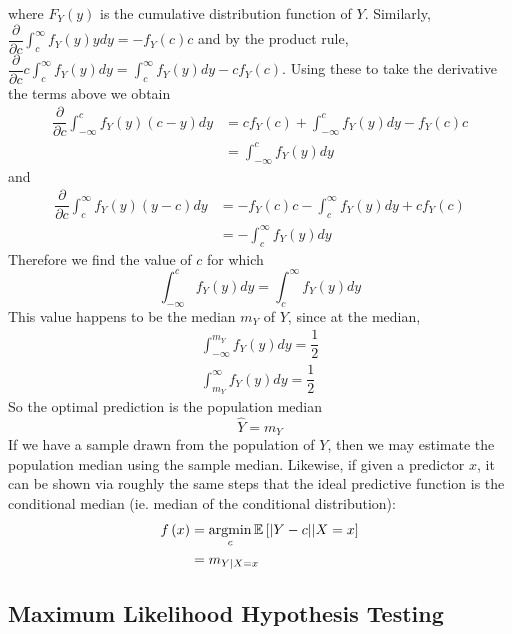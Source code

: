 \documentclass[11pt]{report} %
\begin{document}
where $F_{Y}\left(y\right)$ is the cumulative distribution function of $Y$. Similarly, $\dfrac{\partial }{\partial c}\int_{c}^{\infty}f_{Y}\left(y\right)ydy = -f_{Y}\left(c\right)c$ and by the product rule, $\dfrac{\partial }{\partial c}c\int_{c}^{\infty}f_{Y}\left(y\right)dy = \int_{c}^{\infty}f_{Y}\left(y\right)dy - cf_{Y}\left(c\right)$. Using these to take the derivative the terms above we obtain
\begin{align}
\dfrac{\partial }{\partial c}\int_{-\infty}^{c}f_{Y}\left(y\right)\left(c - y\right)dy &= cf_{Y}\left(c\right) + \int_{-\infty}^{c}f_{Y}\left(y\right)dy - f_{Y}\left(c\right)c \\
&= \int_{-\infty}^{c}f_{Y}\left(y\right)dy
\end{align}
and
\begin{align}
\dfrac{\partial }{\partial c}\int_{c}^{\infty}f_{Y}\left(y\right)\left(y - c\right)dy &= -f_{Y}\left(c\right)c - \int_{c}^{\infty}f_{Y}\left(y\right)dy + cf_{Y}\left(c\right) \\
&= - \int_{c}^{\infty}f_{Y}\left(y\right)dy
\end{align}
Therefore we find the value of $c$ for which
\begin{equation}
\int_{-\infty}^{c}f_{Y}\left(y\right)dy = \int_{c}^{\infty}f_{Y}\left(y\right)dy
\end{equation}
This value happens to be the median $m_{Y}$ of $Y$, since at the median,
\begin{gather}
\int_{-\infty}^{m_{Y}}f_{Y}\left(y\right)dy = \dfrac{1}{2} \\
\int_{m_{Y}}^{\infty}f_{Y}\left(y\right)dy = \dfrac{1}{2}
\end{gather}
So the optimal prediction is the population median
\begin{equation}
\hat{Y} = m_{Y}
\end{equation}
If we have a sample drawn from the population of $Y$, then we may estimate the population median using the sample median. Likewise, if given a predictor $x$, it can be shown via roughly the same steps that the ideal predictive function is the conditional median (ie. median of the conditional distribution):
\begin{align}
f\left(x\right) &= \operatorname*{argmin}_{c}\mathbb{E}\left[\left|Y - c\right|\middle|X = x\right] \\
&= m_{Y|X = x}
\end{align}

\subsection{Maximum Likelihood Hypothesis Testing}
\end{document}
